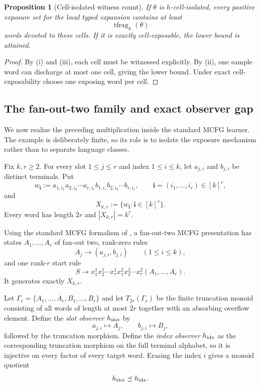 \documentclass[11pt]{article}
\newtheorem{proposition}[definition]{Proposition}
\newcommand{\tfrag}{\operatorname{tfrag}}
\begin{document}
\begin{proposition}[Cell-isolated witness count]
\label{prop:cell-isolated-bound}
If $\theta$ is $h$-cell-isolated, every positive exposure set for the local
typed expansion contains at least
\[
  \tfrag_h(\theta)
\]
words devoted to these cells.  If it is exactly cell-exposable, the lower
bound is attained.
\end{proposition}

\begin{proof}
By (i) and (iii), each cell must be witnessed explicitly.  By (ii), one sample
word can discharge at most one cell, giving the lower bound.  Under exact
cell-exposability choose one exposing word per cell.
\end{proof}

\subsection{The fan-out-two family and exact observer gap}
\label{sec:fanout-two-family}

We now realize the preceding multiplication inside the standard MCFG learner.
The example is deliberately finite, so its role is to isolate the exposure
mechanism rather than to separate language classes.

Fix $k,r\ge2$.  For every slot $1\le j\le r$ and index $1\le i\le k$, let
$a_{j,i}$ and $b_{j,i}$ be distinct terminals.  Put
\[
  w_{\mathbf i}
  :=a_{1,i_1}a_{2,i_2}\cdots a_{r,i_r}
    b_{1,i_1}b_{2,i_2}\cdots b_{r,i_r},
  \qquad
  \mathbf i=(i_1,\ldots,i_r)\in[k]^r,
\]
and
\[
  X_{k,r}:=\{w_{\mathbf i}:\mathbf i\in[k]^r\}.
\]
Every word has length $2r$ and $|X_{k,r}|=k^r$.

Using the standard MCFG formalism of \cite{SekiEtAl1991}, a fan-out-two MCFG presentation has states $A_1,\ldots,A_r$ of fan-out two,
rank-zero rules
\[
  A_j\to(a_{j,i},b_{j,i})
  \qquad(1\le i\le k),
\]
and one rank-$r$ start rule
\[
 S\to
 x_1^1x_2^1\cdots x_r^1x_1^2x_2^2\cdots x_r^2
 (A_1,\ldots,A_r).
\]
It generates exactly $X_{k,r}$.

Let $\Gamma_r=\{A_1,\ldots,A_r,B_1,\ldots,B_r\}$ and let
$T_{2r}(\Gamma_r)$ be the finite truncation monoid consisting of all words of
length at most $2r$ together with an absorbing overflow element.  Define the
\emph{slot observer} $h_{\rm slot}$ by
\[
  a_{j,i}\mapsto A_j,
  \qquad
  b_{j,i}\mapsto B_j,
\]
followed by the truncation morphism.  Define the \emph{index observer}
$h_{\rm idx}$ as the corresponding truncation morphism on the full terminal
alphabet, so it is injective on every factor of every target word.  Erasing the
index $i$ gives a monoid quotient
\[
  h_{\rm slot}\preceq h_{\rm idx}.
\]
\end{document}
